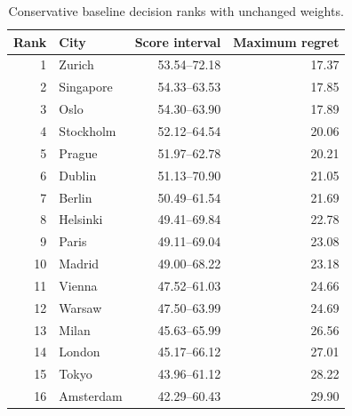 \begin{table}[htbp]\centering
\caption{Conservative baseline decision ranks with unchanged weights.}\label{tab:baseline}
\begin{tabular}{rlrr}\toprule
Rank & City & Score interval & Maximum regret\\\midrule
1 & Zurich & 53.54--72.18 & 17.37 \\
2 & Singapore & 54.33--63.53 & 17.85 \\
3 & Oslo & 54.30--63.90 & 17.89 \\
4 & Stockholm & 52.12--64.54 & 20.06 \\
5 & Prague & 51.97--62.78 & 20.21 \\
6 & Dublin & 51.13--70.90 & 21.05 \\
7 & Berlin & 50.49--61.54 & 21.69 \\
8 & Helsinki & 49.41--69.84 & 22.78 \\
9 & Paris & 49.11--69.04 & 23.08 \\
10 & Madrid & 49.00--68.22 & 23.18 \\
11 & Vienna & 47.52--61.03 & 24.66 \\
12 & Warsaw & 47.50--63.99 & 24.69 \\
13 & Milan & 45.63--65.99 & 26.56 \\
14 & London & 45.17--66.12 & 27.01 \\
15 & Tokyo & 43.96--61.12 & 28.22 \\
16 & Amsterdam & 42.29--60.43 & 29.90 \\
\bottomrule\end{tabular}\end{table}
